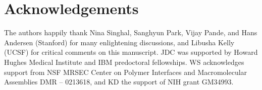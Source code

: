 \section{Acknowledgements}

The authors happily thank Nina Singhal, Sanghyun Park, Vijay Pande, and Hans Andersen (Stanford) for many enlightening discussions, and Libusha Kelly (UCSF) for critical comments on this manuscript.
JDC was supported by Howard Hughes Medical Institute and IBM predoctoral fellowships.  
WS acknowledges support from NSF MRSEC Center on Polymer Interfaces and Macromolecular Assemblies DMR -- 0213618, and KD the support of NIH grant GM34993. 

% 
%

%
